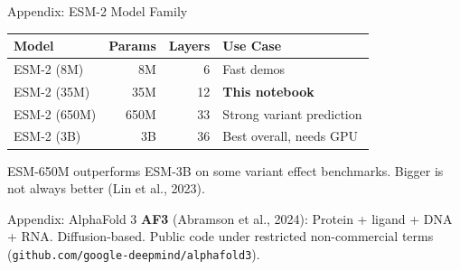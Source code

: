 \documentclass[aspectratio=169,10pt]{beamer}
\begin{document}
\begin{frame}{Appendix: ESM-2 Model Family}
\begin{center}
\renewcommand{\arraystretch}{1.15}
{\small
\begin{tabular}{lrrl}
\toprule
\textbf{Model} & \textbf{Params} & \textbf{Layers} & \textbf{Use Case} \\
\midrule
ESM-2 (8M) & 8M & 6 & Fast demos \\
ESM-2 (35M) & 35M & 12 & \textbf{This notebook} \\
ESM-2 (650M) & 650M & 33 & Strong variant prediction \\
ESM-2 (3B) & 3B & 36 & Best overall, needs GPU \\
\bottomrule
\end{tabular}}
\end{center}
{\small ESM-650M outperforms ESM-3B on some variant effect benchmarks. Bigger is not always better (Lin et al., 2023).}
\end{frame}

\begin{frame}{Appendix: AlphaFold 3}
\textbf{AF3} (Abramson et al., 2024): Protein + ligand + DNA + RNA. Diffusion-based. Public code under restricted non-commercial terms (\texttt{github.com/google-deepmind/alphafold3}).
\end{frame}


\end{document}
